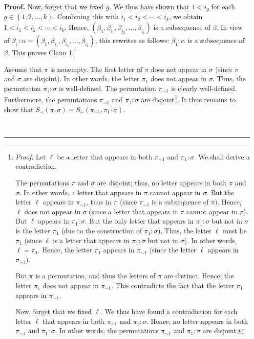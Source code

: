 \documentclass[numbers=enddot,12pt,final,onecolumn,notitlepage]{scrartcl}%
\theoremstyle{definition}
\newenvironment{proof}[1][Proof]{\noindent\textbf{#1.} }{\ \rule{0.5em}{0.5em}}
\newenvironment{verlong}{}{}
\begin{document}
\begin{verlong}
\begin{proof}
Now, forget that we fixed $g$. We thus have shown that $1<i_{g}$ for each
$g\in\left\{  1,2,\ldots,k\right\}  $. Combining this with $i_{1}<i_{2}%
<\cdots<i_{k}$, we obtain $1<i_{1}<i_{2}<\cdots<i_{k}$. Hence, $\left(
\beta_{1},\beta_{i_{1}},\beta_{i_{2}},\ldots,\beta_{i_{k}}\right)  $ is a
subsequence of $\beta$. In view of $\beta_{1}:\alpha=\left(  \beta_{1}%
,\beta_{i_{1}},\beta_{i_{2}},\ldots,\beta_{i_{k}}\right)  $, this rewrites as
follows: $\beta_{1}:\alpha$ is a subsequence of $\beta$. This proves Claim 1.]

Assume that $\pi$ is nonempty. The first letter of $\pi$ does not appear in
$\sigma$ (since $\pi$ and $\sigma$ are disjoint). In other words, the letter
$\pi_{1}$ does not appear in $\sigma$. Thus, the permutation $\pi_{1}:\sigma$
is well-defined. The permutation $\pi_{\sim1}$ is clearly well-defined.
Furthermore, the permutations $\pi_{\sim1}$ and $\pi_{1}:\sigma$ are
disjoint\footnote{\textit{Proof.} Let $\ell$ be a letter that appears in both
$\pi_{\sim1}$ and $\pi_{1}:\sigma$. We shall derive a contradiction.
\par
The permutations $\pi$ and $\sigma$ are disjoint; thus, no letter appears in
both $\pi$ and $\sigma$. In other words, a letter that appears in $\pi$ cannot
appear in $\sigma$. But the letter $\ell$ appears in $\pi_{\sim1}$, thus in
$\pi$ (since $\pi_{\sim1}$ is a subsequence of $\pi$). Hence, $\ell$ does not
appear in $\sigma$ (since a letter that appears in $\pi$ cannot appear in
$\sigma$). But $\ell$ appears in $\pi_{1}:\sigma$. But the only letter that
appears in $\pi_{1}:\sigma$ but not in $\sigma$ is the letter $\pi_{1}$ (due
to the construction of $\pi_{1}:\sigma$). Thus, the letter $\ell$ must be
$\pi_{1}$ (since $\ell$ is a letter that appears in $\pi_{1}:\sigma$ but not
in $\sigma$). In other words, $\ell=\pi_{1}$. Hence, the letter $\pi_{1}$
appears in $\pi_{\sim1}$ (since the letter $\ell$ appears in $\pi_{\sim1}$).
\par
But $\pi$ is a permutation, and thus the letters of $\pi$ are distinct. Hence,
the letter $\pi_{1}$ does not appear in $\pi_{\sim1}$. This contradicts the
fact that the letter $\pi_{1}$ appears in $\pi_{\sim1}$.
\par
Now, forget that we fixed $\ell$. We thus have found a contradiction for each
letter $\ell$ that appears in both $\pi_{\sim1}$ and $\pi_{1}:\sigma$. Hence,
no letter appears in both $\pi_{\sim1}$ and $\pi_{1}:\sigma$. In other words,
the permutations $\pi_{\sim1}$ and $\pi_{1}:\sigma$ are disjoint.}. It thus
remains to show that $S_{\prec}\left(  \pi,\sigma\right)  =S_{\succ}\left(
\pi_{\sim1},\pi_{1}:\sigma\right)  $.


\end{proof}
\end{verlong}
\end{document}

